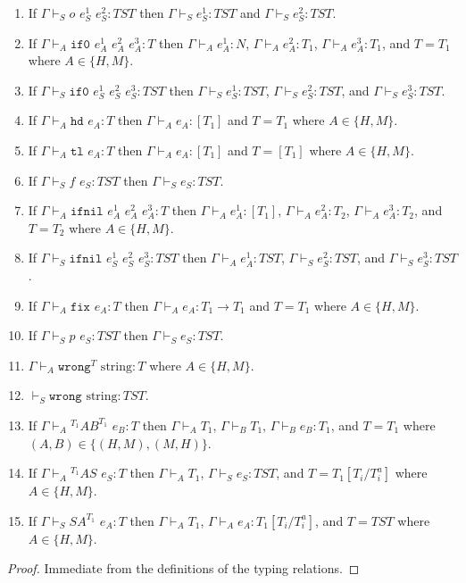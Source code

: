 \begin{lemma}
\begin{enumerate}
\item If $\Gamma\vdash_{S}o$ $e_{S}^{1}$ $e_{S}^{2}:TST$ then $\Gamma\vdash_{S}e_{S}^{1}:TST$ and $\Gamma\vdash_{S}e_{S}^{2}:TST$.
\item If $\Gamma\vdash_{A}\mathtt{if0}$ $e_{A}^{1}$ $e_{A}^{2}$ $e_{A}^{3}:T$ then $\Gamma\vdash_{A}e_{A}^{1}:N$, $\Gamma\vdash_{A}e_{A}^{2}:T_{1}$, $\Gamma\vdash_{A}e_{A}^{3}:T_{1}$, and $T=T_{1}$ where $A\in\lbrace H,M\rbrace$.
\item If $\Gamma\vdash_{S}\mathtt{if0}$ $e_{S}^{1}$ $e_{S}^{2}$ $e_{S}^{3}:TST$ then $\Gamma\vdash_{S}e_{S}^{1}:TST$, $\Gamma\vdash_{S}e_{S}^{2}:TST$, and $\Gamma\vdash_{S}e_{S}^{3}:TST$.
\item If $\Gamma\vdash_{A}\mathtt{hd}$ $e_{A}:T$ then $\Gamma\vdash_{A}e_{A}:[T_{1}]$ and $T=T_{1}$ where $A\in\lbrace H,M\rbrace$.
\item If $\Gamma\vdash_{A}\mathtt{tl}$ $e_{A}:T$ then $\Gamma\vdash_{A}e_{A}:[T_{1}]$ and $T=[T_{1}]$ where $A\in\lbrace H,M\rbrace$.
\item If $\Gamma\vdash_{S}f$ $e_{S}:TST$ then $\Gamma\vdash_{S}e_{S}:TST$.
\item If $\Gamma\vdash_{A}\mathtt{ifnil}$ $e_{A}^{1}$ $e_{A}^{2}$ $e_{A}^{3}:T$ then $\Gamma\vdash_{A}e_{A}^{1}:[T_{1}]$, $\Gamma\vdash_{A}e_{A}^{2}:T_{2}$, $\Gamma\vdash_{A}e_{A}^{3}:T_{2}$, and $T=T_{2}$ where $A\in\lbrace H,M\rbrace$.
\item If $\Gamma\vdash_{S}\mathtt{ifnil}$ $e_{S}^{1}$ $e_{S}^{2}$ $e_{S}^{3}:TST$ then $\Gamma\vdash_{A}e_{A}^{1}:TST$, $\Gamma\vdash_{S}e_{S}^{2}:TST$, and $\Gamma\vdash_{S}e_{S}^{3}:TST$.
\item If $\Gamma\vdash_{A}\mathtt{fix}$ $e_{A}:T$ then $\Gamma\vdash_{A}e_{A}:T_{1}\rightarrow T_{1}$ and $T=T_{1}$ where $A\in\lbrace H,M\rbrace$.
\item If $\Gamma\vdash_{S}p$ $e_{S}:TST$ then $\Gamma\vdash_{S}e_{S}:TST$.
\item $\Gamma\vdash_{A}\mathtt{wrong}^{T}$ $\mathrm{string}:T$ where $A\in\lbrace H,M\rbrace$.
\item $\vdash_{S}\mathtt{wrong}$ $\mathrm{string}:TST$.
\item If $\Gamma\vdash_{A}{^{T_{1}}A}B^{T_{1}}$ $e_{B}:T$ then $\Gamma\vdash_{A}T_{1}$, $\Gamma\vdash_{B}T_{1}$, $\Gamma\vdash_{B}e_{B}:T_{1}$, and $T=T_{1}$ where $(A,B)\in\lbrace(H,M),(M,H)\rbrace$.
\item If $\Gamma\vdash_{A}{^{T_{1}}A}S$ $e_{S}:T$ then $\Gamma\vdash_{A}T_{1}$, $\Gamma\vdash_{S}e_{S}:TST$, and $T=T_{1}[T_{i}/T_{i}^{a}]$ where $A\in\lbrace H,M\rbrace$.
\item If $\Gamma\vdash_{S}SA^{T_{1}}$ $e_{A}:T$ then $\Gamma\vdash_{A}T_{1}$, $\Gamma\vdash_{A}e_{A}:T_{1}[T_{i}/T_{i}^{a}]$, and $T=TST$ where $A\in\lbrace H,M\rbrace$.
\end{enumerate}
\begin{proof}
Immediate from the definitions of the typing relations.
\end{proof}
\end{lemma}
